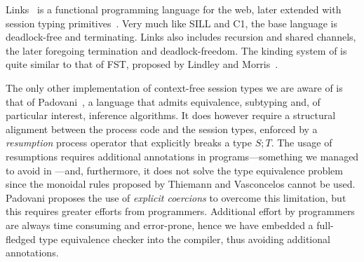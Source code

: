 Links~\cite{DBLP:conf/fmco/CooperLWY06} is a functional programming
language for the web, later extended with session typing
primitives~\cite{DBLP:conf/esop/LindleyM15,Lindley.Morris_Lightweight.functional.session.types}. Very
much like SILL and C1, the base language is deadlock-free and
terminating. Links also includes recursion and shared channels, the
later foregoing termination and deadlock-freedom.
%
The kinding system of \freest{} is quite similar to that of FST,
proposed by Lindley and
Morris~\cite{Lindley.Morris_Lightweight.functional.session.types}.

The only other implementation of context-free session types we are
aware of is that of Padovani~\cite{DBLP:conf/esop/Padovani17}, a
language that admits equivalence, subtyping and, of particular
interest, inference algorithms. It does however require a structural
alignment between the process code and the session types, enforced by
a \emph{resumption} process operator that explicitly breaks a type
$S;T$. The usage of resumptions requires additional annotations in
programs---something we managed to avoid in \freest---and,
furthermore, it does not solve the type equivalence problem since the
monoidal rules proposed by Thiemann and Vasconcelos cannot be
used. Padovani proposes the use of \emph{explicit coercions} to
overcome this limitation, but this requires greater efforts from
programmers.  Additional effort by programmers are always time
consuming and error-prone, hence we have embedded a full-fledged type
equivalence checker into the compiler, thus avoiding additional
annotations.

